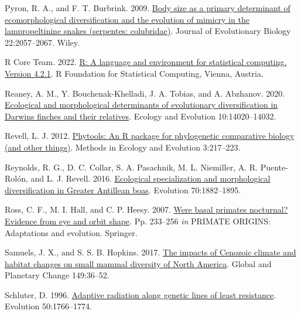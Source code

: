 \documentclass[
  11pt,
]{article}
\newlength{\cslhangindent}
\newlength{\cslentryspacingunit} %
\newenvironment{CSLReferences}[2] %
 {%
  \setlength{\parindent}{0pt}
  \ifodd #1
  \let\oldpar\par
  \def\par{\hangindent=\cslhangindent\oldpar}
  \fi
  \setlength{\parskip}{#2\cslentryspacingunit}
 }%
 {}
\begin{document}
\begin{CSLReferences}{1}{0}
\leavevmode{}%
Pyron, R. A., and F. T. Burbrink. 2009.
\href{https://doi.org/10.1111/j.1420-9101.2009.01820.x}{Body size as a
primary determinant of ecomorphological diversification and the
evolution of mimicry in the lampropeltinine snakes (serpentes:
colubridae)}. Journal of Evolutionary Biology 22:2057--2067. Wiley.

\leavevmode{}%
R Core Team. 2022. \href{https://www.R-project.org/}{R: A language and
environment for statistical computing. Version 4.2.1}. R Foundation for
Statistical Computing, Vienna, Austria.

\leavevmode{}%
Reaney, A. M., Y. Bouchenak-Khelladi, J. A. Tobias, and A. Abzhanov.
2020. \href{https://doi.org/10.1002/ece3.6994}{Ecological and
morphological determinants of evolutionary diversification in
{D}arwin{\textquotesingle}s finches and their relatives}. Ecology and
Evolution 10:14020--14032.

\leavevmode{}%
Revell, L. J. 2012.
\href{https://doi.org/10.1111/j.2041-210X.2011.00169.x}{Phytools: An {R}
package for phylogenetic comparative biology (and other things)}.
Methods in Ecology and Evolution 3:217--223.

\leavevmode{}%
Reynolds, R. G., D. C. Collar, S. A. Pasachnik, M. L. Niemiller, A. R.
Puente-Rolón, and L. J. Revell. 2016.
\href{https://doi.org/10.1111/evo.12987}{{Ecological specialization and
morphological diversification in {G}reater {A}ntillean boas}}. Evolution
70:1882--1895.

\leavevmode{}%
Ross, C. F., M. I. Hall, and C. P. Heesy. 2007.
\href{https://doi.org/10.1007/978-0-387-33507-0_7}{Were basal primates
nocturnal? Evidence from eye and orbit shape}. Pp. 233--256 \emph{in}
PRIMATE ORIGINS: Adaptations and evolution. Springer.

\leavevmode{}%
Samuels, J. X., and S. S. B. Hopkins. 2017.
\href{https://doi.org/10.1016/j.gloplacha.2016.12.014}{{The impacts of
{C}enozoic climate and habitat changes on small mammal diversity of
{N}orth {A}merica}}. Global and Planetary Change 149:36--52.

\leavevmode{}%
Schluter, D. 1996.
\href{https://doi.org/10.1111/j.1558-5646.1996.tb03563.x}{Adaptive
radiation along genetic lines of least resistance}. Evolution
50:1766--1774.


\end{CSLReferences}
\end{document}
